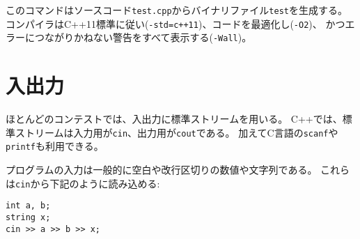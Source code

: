 \begin{comment}
This command produces a binary file \texttt{test}
from the source code \texttt{test.cpp}.
The compiler follows the C++11 standard
(\texttt{-std=c++11}),
optimizes the code (\texttt{-O2})
and shows warnings about possible errors (\texttt{-Wall}).
\end{comment}

このコマンドはソースコード\texttt{test.cpp}からバイナリファイル\texttt{test}を生成する。
コンパイラはC++11標準に従い(\texttt{-std=c++11})、コードを最適化し(\texttt{-O2})、
かつエラーにつながりかねない警告をすべて表示する(\texttt{-Wall})。

\begin{comment}
\section{Input and output}

\index{input and output}
\end{comment}

\section{入出力}

\begin{comment}
In most contests, standard streams are used for
reading input and writing output.
In C++, the standard streams are
\texttt{cin} for input and \texttt{cout} for output.
In addition, the C functions
\texttt{scanf} and \texttt{printf} can be used.

The input for the program usually consists of
numbers and strings that are separated with
spaces and newlines.
They can be read from the \texttt{cin} stream
as follows:
\end{comment}

ほとんどのコンテストでは、入出力に標準ストリームを用いる。
C++では、標準ストリームは入力用が\texttt{cin}、出力用が\texttt{cout}である。
加えてC言語の\texttt{scanf}や\texttt{printf}も利用できる。

プログラムの入力は一般的に空白や改行区切りの数値や文字列である。
これらは\texttt{cin}から下記のように読み込める:

\begin{lstlisting}
int a, b;
string x;
cin >> a >> b >> x;
\end{lstlisting}

\begin{comment}
This kind of code always works,
assuming that there is at least one space
or newline between each element in the input.
For example, the above code can read
both of the following inputs:
\end{comment}

